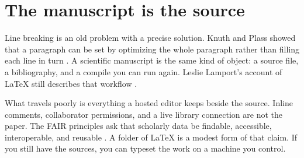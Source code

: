 \section{The manuscript is the source}
\label{sec:intro}

Line breaking is an old problem with a precise solution.
Knuth and Plass showed that a paragraph can be set by optimizing the whole paragraph rather than filling each line in turn \cite{knuth1981breaking}.
A scientific manuscript is the same kind of object: a source file, a bibliography, and a compile you can run again.
Leslie Lamport's account of \LaTeX{} still describes that workflow \cite{lamport1994latex}.

What travels poorly is everything a hosted editor keeps beside the source.
Inline comments, collaborator permissions, and a live library connection are not the paper.
The FAIR principles ask that scholarly data be findable, accessible, interoperable, and reusable \cite{wilkinson2016fair}.
A folder of \LaTeX{} is a modest form of that claim.
If you still have the sources, you can typeset the work on a machine you control.
